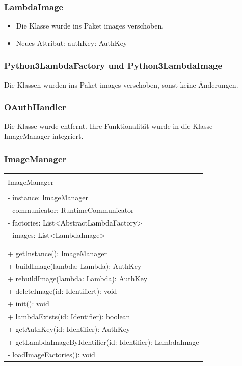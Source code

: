 \documentclass[a4paper,20pt,oneside]{book}
\begin{document}
	\subsubsection{LambdaImage}
	\begin{itemize}
	\item Die Klasse wurde ins Paket images verschoben.
	\item Neues Attribut: authKey: AuthKey
	\end{itemize}
	\subsubsection{Python3LambdaFactory und Python3LambdaImage}
	Die Klassen wurden ins Paket images verschoben, sonst keine Änderungen.
	\subsubsection{OAuthHandler}
	Die Klasse wurde entfernt. Ihre Funktionalität wurde in die Klasse ImageManager integriert.
	\subsubsection{ImageManager}
	\centering
	\vspace{0.5cm}
	\begin{tabular}{|l|}
	\hline \\
	ImageManager \\ \hline \\
	- \underline{instance: ImageManager} \\
	- communicator: RuntimeCommunicator \\
	- factories: List<AbstractLambdaFactory> \\
	- images: List<LambdaImage> \\
	\\ \hline \\
	+ \underline{getInstance(): ImageManager} \\
	+ buildImage(lambda: Lambda): AuthKey \\
	+ rebuildImage(lambda: Lambda): AuthKey \\
	+ deleteImage(id: Identifiert): void \\
	+ init(): void \\
	+ lambdaExists(id: Identifier): boolean \\
	+ getAuthKey(id: Identifier): AuthKey \\
	+ getLambdaImageByIdentifier(id: Identifier): LambdaImage \\
	- loadImageFactories(): void
 	\\ \hline
	\end{tabular}
		 
\end{document}
